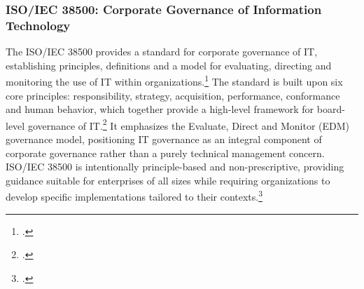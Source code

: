 \subsubsection{ISO/IEC 38500: Corporate Governance of Information Technology}
\label{subsubsec:ISO38500}
The \ac{ISO/IEC} 38500 provides a standard for corporate governance of IT, establishing principles, definitions and a model for evaluating, directing and monitoring the use of IT within organizations.\footcite[57]{internationalorganizationforstandardizationISOIEC3850020182018}
The standard is built upon six core principles: responsibility, strategy, acquisition, performance, conformance and human behavior, which together provide a high-level framework for board-level governance of IT.\footcite[57-60]{internationalorganizationforstandardizationISOIEC3850020182018}
It emphasizes the \glqq{}Evaluate, Direct and Monitor\grqq{} (EDM) governance model, positioning IT governance as an integral component of corporate governance rather than a purely technical management concern.
\ac{ISO/IEC} 38500 is intentionally principle-based and non-prescriptive, providing guidance suitable for enterprises of all sizes while requiring organizations to develop specific implementations tailored to their contexts.\footcite[57]{internationalorganizationforstandardizationISOIEC3850020182018}

